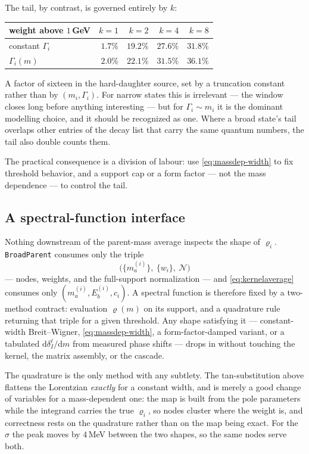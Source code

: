 \documentclass[11pt]{article}
\begin{document}
The tail, by contrast, is governed entirely by $k$:

\begin{center}
\begin{tabular}{lrrrr}
\hline
weight above $1$\,GeV & $k=1$ & $k=2$ & $k=4$ & $k=8$\\
\hline
constant $\Gamma_i$   & $1.7\%$ & $19.2\%$ & $27.6\%$ & $31.8\%$\\
$\Gamma_i(m)$         & $2.0\%$ & $22.1\%$ & $31.5\%$ & $36.1\%$\\
\hline
\end{tabular}
\end{center}

\noindent
A factor of sixteen in the hard-daughter source, set by a truncation
constant rather than by $(m_i,\Gamma_i)$.  For narrow states this is
irrelevant --- the window closes long before anything interesting --- but
for $\Gamma_i\sim m_i$ it is the dominant modelling choice, and it should be
recognized as one.  Where a broad state's tail overlaps other entries of the
decay list that carry the same quantum numbers, the tail also double counts
them.

The practical consequence is a division of labour: use
\eqref{eq:massdep-width} to fix threshold behavior, and a support cap or a
form factor --- not the mass dependence --- to control the tail.

\subsection{A spectral-function interface}
\label{sec:spectralinterface}

Nothing downstream of the parent-mass average inspects the shape of
$\varrho_i$.  \texttt{BroadParent} consumes only the triple
\[
\big(\{m_a^{(i)}\},\ \{w_i\},\ \mathcal{N}\big)
\]
--- nodes, weights, and the full-support normalization --- and
\eqref{eq:kernelaverage} consumes only $(m_a^{(i)},E_b^{(i)},c_i)$.  A
spectral function is therefore fixed by a two-method contract: evaluation
$\varrho(m)$ on its support, and a quadrature rule returning that triple for
a given threshold.  Any shape satisfying it --- constant-width
Breit--Wigner, \eqref{eq:massdep-width}, a form-factor-damped variant, or a
tabulated $\mathrm{d}\delta_I^\ell/\mathrm{d}m$ from measured phase shifts
--- drops in without touching the kernel, the matrix assembly, or the
cascade.

The quadrature is the only method with any subtlety.  The tan-substitution
above flattens the Lorentzian \emph{exactly} for a constant width, and is
merely a good change of variables for a mass-dependent one: the map is built
from the pole parameters while the integrand carries the true $\varrho_i$, so
nodes cluster where the weight is, and correctness rests on the quadrature
rather than on the map being exact.  For the $\sigma$ the peak moves by
$4$\,MeV between the two shapes, so the same nodes serve both.
\end{document}
